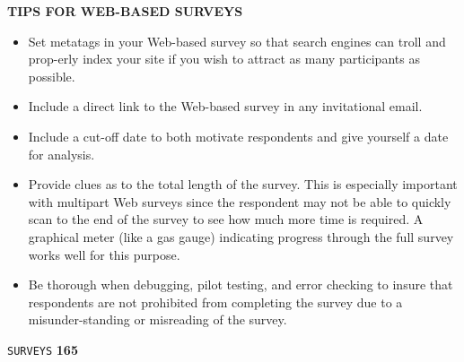 \documentclass{article}
\begin{document}
\vspace*{1cm}
\large{
\textbf{TIPS FOR WEB-BASED SURVEYS}\\
}

\vspace*{0.3cm}
\begin{itemize}
  \item Set metatags in your Web-based survey so that search engines can troll and prop-erly index your site if you wish to attract as many participants as possible.\\
  \item Include a direct link to the Web-based survey in any invitational email.\\
  \item Include a cut-off date to both motivate respondents and give yourself a date for analysis.\\
  \item Provide clues as to the total length of the survey. This is especially important with multipart Web surveys since the respondent may not be able to quickly scan to the end of the survey to see how much more time is required. A graphical meter (like a gas gauge) indicating progress through the full survey works well for this purpose.\\
  \item Be thorough when debugging, pilot testing, and error checking to insure that respondents are not prohibited from completing the survey due to a misunder-standing or misreading of the survey.\\
\end{itemize}

\newpage
\begin{flushright}
 \texttt{SURVEYS} \hspace*{1cm} \textbf{165}
\end{flushright}
\end{document}
